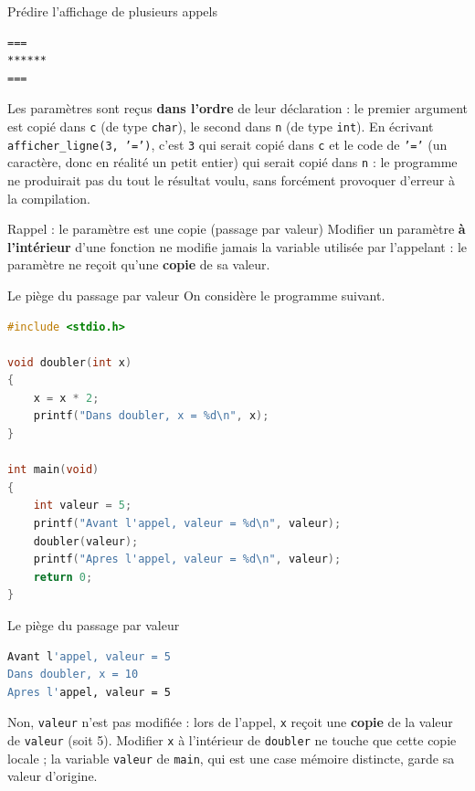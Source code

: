 \begin{UPSTIprofOnlyEnv}
    \begin{UPSTIcorrectionP}{Prédire l'affichage de plusieurs appels}
        \begin{lstlisting}[language=bash,style=console]
===
******
===
        \end{lstlisting}
        Les paramètres sont reçus \textbf{dans l'ordre} de leur déclaration : le premier argument est copié dans \texttt{c} (de type \texttt{char}), le second dans \texttt{n} (de type \texttt{int}). En écrivant \texttt{afficher\_ligne(3, '=')}, c'est \texttt{3} qui serait copié dans \texttt{c} et le code de \texttt{'='} (un caractère, donc en réalité un petit entier) qui serait copié dans \texttt{n} : le programme ne produirait pas du tout le résultat voulu, sans forcément provoquer d'erreur à la compilation.
    \end{UPSTIcorrectionP}
\end{UPSTIprofOnlyEnv}


\begin{UPSTIwarning}{Rappel : le paramètre est une copie (passage par valeur)}
    Modifier un paramètre \textbf{à l'intérieur} d'une fonction ne modifie jamais la variable utilisée par l'appelant : le paramètre ne reçoit qu'une \textbf{copie} de sa valeur.
\end{UPSTIwarning}

\begin{UPSTIexercice}{Le piège du passage par valeur}
    On considère le programme suivant.
    \begin{lstlisting}[language=C]
#include <stdio.h>

void doubler(int x)
{
    x = x * 2;
    printf("Dans doubler, x = %d\n", x);
}

int main(void)
{
    int valeur = 5;
    printf("Avant l'appel, valeur = %d\n", valeur);
    doubler(valeur);
    printf("Apres l'appel, valeur = %d\n", valeur);
    return 0;
}
    \end{lstlisting}
\end{UPSTIexercice}

\begin{UPSTIprofOnlyEnv}
    \begin{UPSTIcorrectionP}{Le piège du passage par valeur}
        \begin{lstlisting}[language=bash,style=console]
Avant l'appel, valeur = 5
Dans doubler, x = 10
Apres l'appel, valeur = 5
        \end{lstlisting}
        Non, \texttt{valeur} n'est pas modifiée : lors de l'appel, \texttt{x} reçoit une \textbf{copie} de la valeur de \texttt{valeur} (soit 5). Modifier \texttt{x} à l'intérieur de \texttt{doubler} ne touche que cette copie locale ; la variable \texttt{valeur} de \texttt{main}, qui est une case mémoire distincte, garde sa valeur d'origine.
    \end{UPSTIcorrectionP}
\end{UPSTIprofOnlyEnv}
